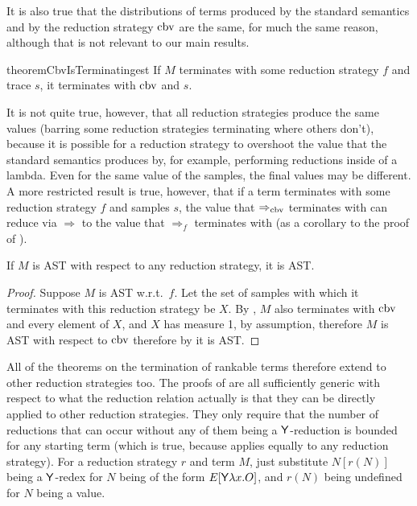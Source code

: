It is also true that the distributions of terms produced by the standard semantics and by the reduction strategy $\operatorname{cbv}$ are the same, for much the same reason, although that is not relevant to our main results.

\begin{restatable}{theorem}{CbvIsTerminatingest} \label{thm:CbvIsTerminatingest}
If $M$ terminates with some reduction strategy $f$ and trace $s$, it terminates with $\operatorname{cbv}$ and $s$.
\end{restatable}

It is not quite true, however, that all reduction strategies produce the same values (barring some reduction strategies terminating where others don't), because it is possible for a reduction strategy to overshoot the value that the standard semantics produces by, for example, performing reductions inside of a lambda. Even for the same value of the samples, the final values may be different. A more restricted result is true, however, that if a term terminates with some reduction strategy $f$ and samples $s$, the value that $\Rightarrow_{\operatorname{cbv}}$ terminates with can reduce via $\Rightarrow$ to the value that $\Rightarrow_f$ terminates with (as a corollary to the proof of ).

\begin{corollary}
If $M$ is AST with respect to any reduction strategy, it is AST.
\end{corollary}
\begin{proof}
Suppose $M$ is AST w.r.t.~$f$. Let the set of samples with which it terminates with this reduction strategy be $X$. By , $M$ also terminates with $\operatorname{cbv}$ and every element of $X$, and $X$ has measure 1, by assumption, therefore $M$ is AST with respect to $\operatorname{cbv}$ therefore by  it is AST.
\end{proof}

All of the theorems on the termination of rankable terms therefore extend to other reduction strategies too. The proofs of  are all sufficiently generic with respect to what the reduction relation actually is that they can be directly applied to other reduction strategies. They only require that the number of reductions that can occur without any of them being a $\mathsf{Y}$-reduction is bounded for any starting term (which is true, because  applies equally to any reduction strategy). For a reduction strategy $r$ and term $M$, just substitute $N[r(N)]$ being a $\mathsf{Y}$-redex for $N$ being of the form $E[\mathsf{Y} \lambda x. O]$, and $r(N)$ being undefined for $N$ being a value.

